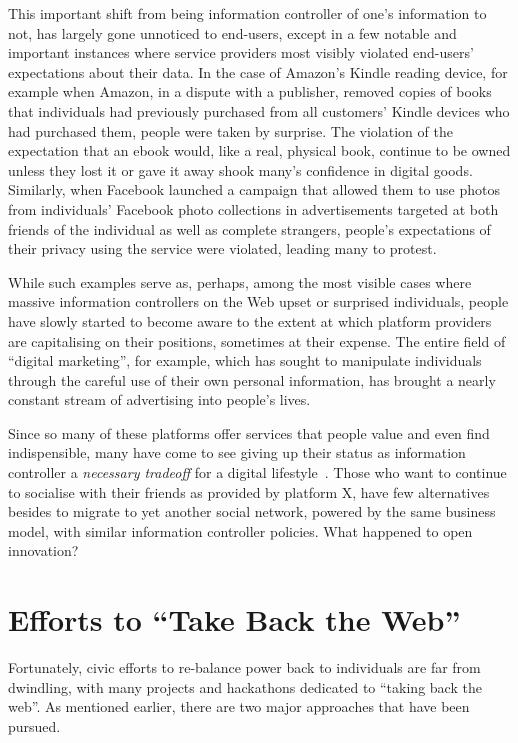 \documentclass{amsart}
\begin{document}
This important shift from being information controller of one's information to not, has largely gone unnoticed to end-users, except in a few notable and important instances where service providers most visibly violated end-users' expectations about their data.  In the case of Amazon's Kindle reading device, for example when Amazon, in a dispute with a publisher, removed copies of books that individuals had previously purchased from all customers' Kindle devices who had purchased them, people were taken by surprise.  The violation of the expectation that an ebook would, like a real, physical book, continue to be owned unless they lost it or gave it away shook many's confidence in digital goods.   Similarly, when Facebook launched a campaign that allowed them to use photos from individuals' Facebook photo collections in advertisements targeted at both friends of the individual as well as complete strangers, people's expectations of their privacy using the service were violated, leading many to protest.

While such examples serve as, perhaps, among the most visible cases where massive information controllers on the Web upset or surprised individuals,  people have slowly started to become aware to the extent at which platform providers are capitalising on their positions, sometimes at their expense.  The entire field of ``digital marketing'', for example, which has sought to manipulate individuals through the careful use of their own personal information, has brought a nearly constant stream of advertising into people's lives.  

Since so many of these platforms offer services that people value and even find indispensible, many have come to see giving up their status as information controller a \emph{necessary tradeoff} for a digital lifestyle~\cite{}. Those who want to continue to socialise with their friends as provided by platform X, have few alternatives besides to migrate to yet another social network, powered by the same business model, with similar information controller policies.  What happened to open innovation? 

\section{Efforts to ``Take Back the Web''}

Fortunately, civic efforts to re-balance power back to individuals are far from dwindling, with many projects and hackathons dedicated to ``taking back the web''.  As mentioned earlier, there are two major approaches that have been pursued.
\end{document}
